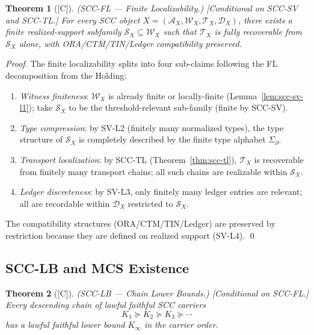 \documentclass[12pt,oneside]{amsbook}
\theoremstyle{plain}
\newtheorem{theorem}{Theorem}[section]
\theoremstyle{definition}
\theoremstyle{remark}
\newcommand{\status}[1]{\textup{[#1]}}
\begin{document}
\begin{theorem}[\status{C}]\label{thm:scc-fl}
\textup{(SCC-FL --- Finite Localizability.)}
\textup{[Conditional on SCC-SV and SCC-TL.]}
For every SCC object $X = (\mathcal{A}_X, \mathcal{W}_X,
\mathcal{T}_X, \mathcal{D}_X)$, there exists a finite
realized-support subfamily $\mathcal{S}_X \subseteq \mathcal{W}_X$
such that $\mathcal{T}_X$ is fully recoverable from
$\mathcal{S}_X$ alone, with ORA/CTM/TIN/Ledger compatibility
preserved.
\end{theorem}

\begin{proof}
The finite localizability splits into four sub-claims following
the FL decomposition from the Holding:
\begin{enumerate}[label=\textup{(FL-\arabic*)}]
 \item \emph{Witness finiteness}: $\mathcal{W}_X$ is already
 finite or locally-finite (Lemma~\ref{lem:scc-sv-l1});
 take $\mathcal{S}_X$ to be the threshold-relevant sub-family
 (finite by SCC-SV).
 \item \emph{Type compression}: by SV-L2 (finitely many
 normalized types), the type structure of $\mathcal{S}_X$
 is completely described by the finite type alphabet
 $\Sigma_\partial$.
 \item \emph{Transport localization}: by SCC-TL
 (Theorem~\ref{thm:scc-tl}), $\mathcal{T}_X$ is recoverable
 from finitely many transport chains; all such chains are
 realizable within $\mathcal{S}_X$.
 \item \emph{Ledger discreteness}: by SV-L3, only finitely
 many ledger entries are relevant; all are recordable within
 $\mathcal{D}_X$ restricted to $\mathcal{S}_X$.
\end{enumerate}
The compatibility structures (ORA/CTM/TIN/Ledger) are preserved
by restriction because they are defined on realized support
(SV-L4). \qed
\end{proof}

\subsection{SCC-LB and MCS Existence}

\begin{theorem}[\status{C}]\label{thm:scc-lb}
\textup{(SCC-LB --- Chain Lower Bounds.)}
\textup{[Conditional on SCC-FL.]}
Every descending chain of lawful faithful SCC carriers
\[
 K_1 \succeq K_2 \succeq K_3 \succeq \cdots
\]
has a lawful faithful lower bound $K_\infty$ in the carrier order.
\end{theorem}
\end{document}
